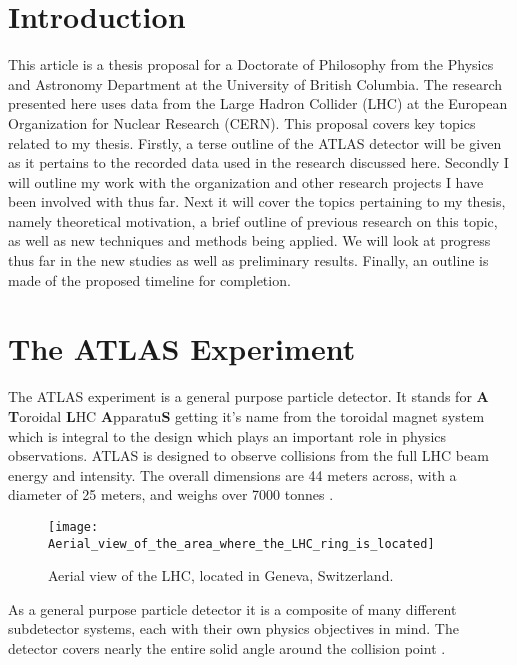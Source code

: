 \documentclass[12pt]{article}
\begin{document}

\newpage
\section{Introduction}
This article is a thesis proposal for a Doctorate of Philosophy from the Physics
and Astronomy Department at the University of British Columbia. The research
presented here uses data from the Large Hadron Collider (LHC) at the European
Organization for Nuclear Research (CERN). This proposal covers key topics
related to my thesis. Firstly, a terse outline of the ATLAS detector will be
given as it pertains to the recorded data used in the research discussed here.
Secondly I will outline my work with the organization and other research
projects I have been involved with thus far. Next it will cover the topics
pertaining to my thesis, namely theoretical motivation, a brief outline of
previous research on this topic, as well as new techniques and methods being
applied. We will look at progress thus far in the new studies as well
as preliminary results. Finally, an outline is made of the proposed timeline for
completion.

\section{The ATLAS Experiment}
The ATLAS experiment is a general purpose particle detector. It stands for
\textbf{A} \textbf{T}oroidal \textbf{L}HC \textbf{A}pparatu\textbf{S} getting
it's name from the toroidal magnet system which is integral to the design which
plays an important role in physics observations. ATLAS is designed to observe
collisions from the full LHC beam energy and intensity. The overall dimensions
are 44 meters across, with a diameter of 25 meters, and weighs over 7000 tonnes
\cite{Aad_2024}. \begin{wrapfigure}{l}{0.42\textwidth}
    \centering
    \texttt{[image: Aerial\_view\_of\_the\_area\_where\_the\_LHC\_ring\_is\_located]}
    \caption{Aerial view of the LHC, located in Geneva, Switzerland.}
    \label{fig:aerial_view}
\end{wrapfigure} As a general purpose particle detector it is a composite of
many different subdetector systems, each with their own physics objectives in
mind. The detector covers nearly the entire solid angle around the
collision point \cite{The_ATLAS_Collaboration_2008}. 
\end{document}
